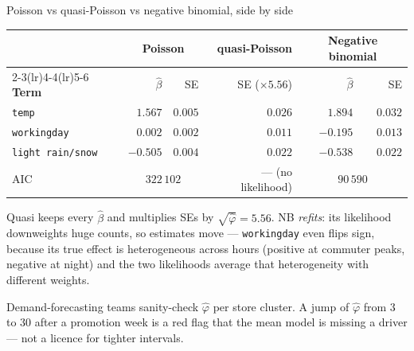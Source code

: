 \documentclass[aspectratio=169,11pt]{beamer}
\begin{document}
\begin{frame}{Poisson vs quasi-Poisson vs negative binomial, side by side}
  \footnotesize
  \begin{center}
  \begin{tabular}{@{}lrrrrr@{}}
    \toprule
    & \multicolumn{2}{c}{\textbf{Poisson}} & \textbf{quasi-Poisson} & \multicolumn{2}{c}{\textbf{Negative binomial}} \\
    \cmidrule(lr){2-3}\cmidrule(lr){4-4}\cmidrule(lr){5-6}
    \textbf{Term} & $\hat\beta$ & SE & SE ($\times 5.56$) & $\hat\beta$ & SE \\
    \midrule
    \texttt{temp} & $1.567$ & $0.005$ & $0.026$ & $1.894$ & $0.032$ \\
    \texttt{workingday} & $0.002$ & $0.002$ & $0.011$ & $-0.195$ & $0.013$ \\
    \texttt{light rain/snow} & $-0.505$ & $0.004$ & $0.022$ & $-0.538$ & $0.022$ \\
    \midrule
    AIC & \multicolumn{2}{c}{$322\,102$} & --- (no likelihood) & \multicolumn{2}{c}{$90\,590$} \\
    \bottomrule
  \end{tabular}
  \end{center}
  \begin{readme}
    Quasi keeps every $\hat\beta$ and multiplies SEs by $\sqrt{\hat\varphi}=5.56$. NB
    \emph{refits}: its likelihood downweights huge counts, so estimates move ---
    \texttt{workingday} even flips sign, because its true effect is heterogeneous
    across hours (positive at commuter peaks, negative at night) and the two
    likelihoods average that heterogeneity with different weights.
  \end{readme}
  \begin{industry}
    Demand-forecasting teams sanity-check $\hat\varphi$ per store cluster. A jump of
    $\hat\varphi$ from 3 to 30 after a promotion week is a red flag that the mean model
    is missing a driver --- not a licence for tighter intervals.
  \end{industry}
\end{frame}
\end{document}
